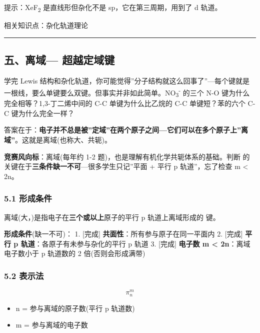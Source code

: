 提示：XeF\textsubscript{2} 是直线形但杂化不是 sp，它在第三周期，用到了 d 轨道。

相关知识点：杂化轨道理论

\begin{center}\rule{0.5\linewidth}{0.5pt}\end{center}

\subsection{\texorpdfstring{五、离域 --- 超越定域键}{五、离域--- 超越定域键}}\label{ux4e94ux79bbux57df-ux8d85ux8d8aux5b9aux57dfux952e}

学完 Lewis 结构和杂化轨道，你可能觉得''分子结构就这么回事了''---每个键就是一根线，要么单键要么双键。但事实并非如此简单。NO\textsubscript{3}\textsuperscript{-} 的三个 N-O 键为什么完全相等？1,3-丁二烯中间的 C-C 单键为什么比乙烷的 C-C 单键短？苯的六个 C-C 键为什么完全一样？

答案在于：\textbf{电子并不总是被''定域''在两个原子之间---它们可以在多个原子上''离域''}。这就是离域(也称大、共轭)。

\textbf{竞赛风向标}：离域(每年约 1-2 题)，也是理解有机化学共轭体系的基础。判断  的关键在于\textbf{三条件缺一不可}---很多学生只记''平面 + 平行 p 轨道''，忘了检查 m \textless{} 2n。

\subsubsection{5.1 形成条件}\label{ux5f62ux6210ux6761ux4ef6}

离域(大，)是指电子在\textbf{三个或以上}原子的平行 p 轨道上离域形成的 \派 键。

\textbf{形成条件}(缺一不可)：
1. {[}完成{]} \textbf{共面性}：所有参与原子在同一平面内
2. {[}完成{]} \textbf{平行 p 轨道}：各原子有未参与杂化的平行 p 轨道
3. {[}完成{]} \textbf{电子数 m \textless{} 2n}：离域电子数小于 p 轨道数的 2 倍(否则会形成满带)

\subsubsection{\texorpdfstring{5.2  表示法}{5.2 表示法}}\label{ux8868ux793aux6cd5}

\[
\pi_n^m
\]

\begin{itemize}
\tightlist
\item
  n = 参与离域的原子数(平行 p 轨道数)
\item
  m = 参与离域的电子数
\end{itemize}

